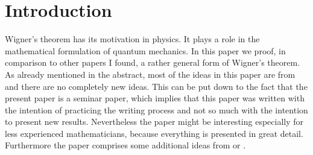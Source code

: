 \section{Introduction}

Wigner's theorem has its motivation in physics. It plays a role in the mathematical formulation of quantum mechanics. In this paper we proof, in comparison to other papers I found, a rather general form of Wigner's theorem. As already mentioned in the abstract, most of the ideas in this paper are from \cite{spiegel2018constructive} and there are no completely new ideas. This can be put down to the fact that the present paper is a seminar paper, which implies that this paper was written with the intention of practicing the writing process and not so much with the intention to present new results. Nevertheless the paper might be interesting especially for less experienced mathematicians, because everything is presented in great detail. Furthermore the paper comprises some additional ideas from \cite{Geh_r_2014} or \cite{Bargmann_1964}. 




